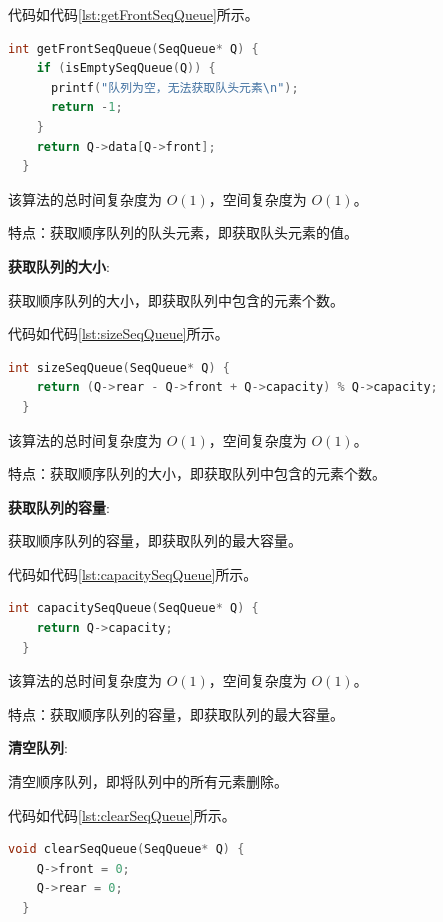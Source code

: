 \documentclass[lang=cn,newtx,10pt,scheme=chinese]{../elegantbook}
\begin{document}
代码如代码\ref{lst:getFrontSeqQueue}所示。

\begin{lstlisting}[language=C++, caption={获取队头元素示例代码}, label={lst:getFrontSeqQueue}]
  int getFrontSeqQueue(SeqQueue* Q) {
    if (isEmptySeqQueue(Q)) {
      printf("队列为空，无法获取队头元素\n");
      return -1;
    }
    return Q->data[Q->front];
  }

\end{lstlisting}

该算法的总时间复杂度为 $O(1)$，空间复杂度为 $O(1)$。

特点：获取顺序队列的队头元素，即获取队头元素的值。

\textbf{获取队列的大小}:

获取顺序队列的大小，即获取队列中包含的元素个数。

代码如代码\ref{lst:sizeSeqQueue}所示。

\begin{lstlisting}[language=C++, caption={获取队列的大小示例代码}, label={lst:sizeSeqQueue}]
  int sizeSeqQueue(SeqQueue* Q) {
    return (Q->rear - Q->front + Q->capacity) % Q->capacity;
  }

\end{lstlisting}

该算法的总时间复杂度为 $O(1)$，空间复杂度为 $O(1)$。

特点：获取顺序队列的大小，即获取队列中包含的元素个数。

\textbf{获取队列的容量}:

获取顺序队列的容量，即获取队列的最大容量。

代码如代码\ref{lst:capacitySeqQueue}所示。

\begin{lstlisting}[language=C++, caption={获取队列的容量示例代码}, label={lst:capacitySeqQueue}]
  int capacitySeqQueue(SeqQueue* Q) {
    return Q->capacity;
  }

\end{lstlisting}

该算法的总时间复杂度为 $O(1)$，空间复杂度为 $O(1)$。

特点：获取顺序队列的容量，即获取队列的最大容量。

\textbf{清空队列}:

清空顺序队列，即将队列中的所有元素删除。

代码如代码\ref{lst:clearSeqQueue}所示。

\begin{lstlisting}[language=C++, caption={清空队列示例代码}, label={lst:clearSeqQueue}]
  void clearSeqQueue(SeqQueue* Q) {
    Q->front = 0;
    Q->rear = 0;
  }

\end{lstlisting}
\end{document}
